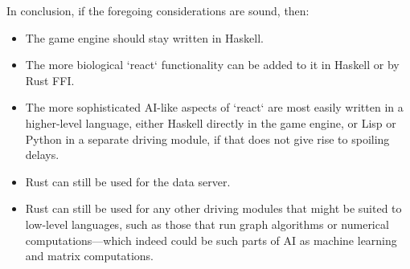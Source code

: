 In conclusion, if the foregoing considerations are sound, then:
\begin{itemize}
    \item The game engine should stay written in Haskell.
    \item The more biological `react` functionality can be added to it in
    Haskell or by Rust FFI\@.
    \item The more sophisticated AI-like aspects of `react` are most easily
    written in a higher-level language, either Haskell directly in the game
    engine, or Lisp or Python in a separate driving module, if that does not
    give rise to spoiling delays.
    \item Rust can still be used for the data server.
    \item Rust can still be used for any other driving modules that might be
    suited to low-level languages, such as those that run graph algorithms or
    numerical computations---which indeed could be such parts of AI as machine
    learning and matrix computations.
\end{itemize}